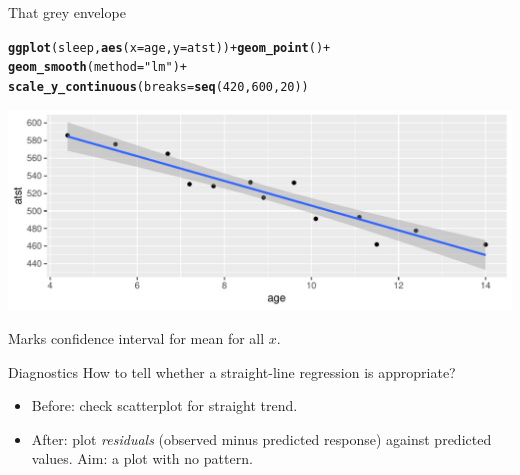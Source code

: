 \documentclass[unknownkeysallowed]{beamer}\usepackage[]{graphicx}\usepackage[]{color}
\makeatletter
\def\maxwidth{ %
  \ifdim\Gin@nat@width>\linewidth
    \linewidth
  \else
    \Gin@nat@width
  \fi
}
\newcommand{\hlnum}[1]{\textcolor[rgb]{0.686,0.059,0.569}{#1}}%
\newcommand{\hlstr}[1]{\textcolor[rgb]{0.192,0.494,0.8}{#1}}%
\newcommand{\hlopt}[1]{\textcolor[rgb]{0,0,0}{#1}}%
\newcommand{\hlstd}[1]{\textcolor[rgb]{0.345,0.345,0.345}{#1}}%
\newcommand{\hlkwc}[1]{\textcolor[rgb]{0.333,0.667,0.333}{#1}}%
\newcommand{\hlkwd}[1]{\textcolor[rgb]{0.737,0.353,0.396}{\textbf{#1}}}%
\newenvironment{kframe}{%
 \def\at@end@of@kframe{}%
 \ifinner\ifhmode%
  \def\at@end@of@kframe{\end{minipage}}%
  \begin{minipage}{\columnwidth}%
 \fi\fi%
 \def\FrameCommand##1{\hskip\@totalleftmargin \hskip-\fboxsep
 \colorbox{shadecolor}{##1}\hskip-\fboxsep
     \hskip-\linewidth \hskip-\@totalleftmargin \hskip\columnwidth}%
 \MakeFramed {\advance\hsize-\width
   \@totalleftmargin\z@ \linewidth\hsize
   \@setminipage}}%
 {\par\unskip\endMakeFramed%
 \at@end@of@kframe}
\newenvironment{knitrout}{}{} %
\makeatother
\begin{document}
\begin{frame}[fragile]{That grey envelope}
  
\begin{knitrout}
\color{fgcolor}\begin{kframe}
\begin{alltt}
\hlkwd{ggplot}\hlstd{(sleep,}\hlkwd{aes}\hlstd{(}\hlkwc{x}\hlstd{=age,}\hlkwc{y}\hlstd{=atst))}\hlopt{+}\hlkwd{geom_point}\hlstd{()}\hlopt{+}
  \hlkwd{geom_smooth}\hlstd{(}\hlkwc{method}\hlstd{=}\hlstr{"lm"}\hlstd{)}\hlopt{+}
  \hlkwd{scale_y_continuous}\hlstd{(}\hlkwc{breaks}\hlstd{=}\hlkwd{seq}\hlstd{(}\hlnum{420}\hlstd{,}\hlnum{600}\hlstd{,}\hlnum{20}\hlstd{))}
\end{alltt}
\end{kframe}
\includegraphics[width=\maxwidth]{figure/unnamed-chunk-13-1} 

\end{knitrout}

Marks confidence interval for mean for all $x$.
  
\end{frame}

\begin{frame}[fragile]{Diagnostics}
How to tell whether a straight-line regression is appropriate?

\vspace{3ex}

\begin{itemize}
\item Before: check scatterplot for straight trend.
\item After: plot {\em residuals} (observed minus predicted response) against predicted values. Aim: a plot with no pattern.
\end{itemize}

\vspace{3ex}


\end{frame}
\end{document}
